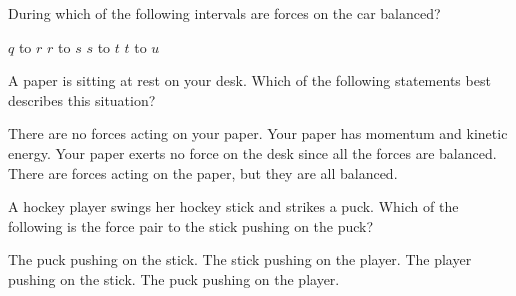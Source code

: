 \documentclass[answers]{exam}
\begin{document}
\begin{questions}
\begin{center}
\end{center}

During which of the following intervals are forces on the car balanced?

\begin{randomizeoneparchoices}
    \choice $q$ to $r$
    \choice $r$ to $s$
    \correctchoice $s$ to $t$
    \choice $t$ to $u$
\end{randomizeoneparchoices}

\question 
A paper is sitting at rest on your desk.  Which of the following statements best describes this situation?

\begin{randomizechoices}
    \choice There are no forces acting on your paper.
    \choice Your paper has momentum and kinetic energy.
    \choice Your paper exerts no force on the desk since all the forces are balanced.
    \correctchoice There are forces acting on the paper, but they are all balanced.
\end{randomizechoices}

\question
A hockey player swings her hockey stick and strikes a puck.  Which of the following is the force pair to the stick pushing on the puck?

\begin{randomizechoices}
    \correctchoice The puck pushing on the stick.
    \choice The stick pushing on the player.
    \choice The player pushing on the stick.
    \choice The puck pushing on the player.
\end{randomizechoices}



\end{questions}
\end{document}
